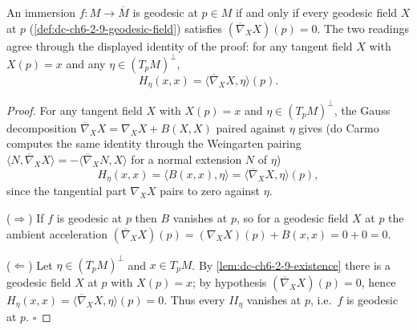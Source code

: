 \begin{lemma}
  \label{lem:dc-ch6-2-9-field}


  An immersion $f:M\to\overline{M}$ is geodesic at $p\in M$ if and only if every
  geodesic field $X$ at $p$
  (\cref{def:dc-ch6-2-9-geodesic-field}) satisfies
  $(\overline{\nabla}_X X)(p)=0$. The two readings agree through the displayed
  identity of the proof: for any tangent field $X$ with $X(p)=x$ and any
  $\eta\in(T_pM)^\perp$,
  $$
  H_\eta(x,x)=\langle\overline{\nabla}_X X,\eta\rangle(p).
  $$
\end{lemma}
\begin{proof}

  For any tangent field $X$ with $X(p)=x$ and $\eta\in(T_pM)^\perp$, the Gauss
  decomposition $\overline{\nabla}_X X=\nabla_X X+B(X,X)$ paired against $\eta$
  gives (do Carmo computes the same identity through the Weingarten pairing
  $\langle N,\overline{\nabla}_X X\rangle=-\langle\overline{\nabla}_X N,X\rangle$
  for a normal extension $N$ of $\eta$)
  $$
  H_\eta(x,x)=\langle B(x,x),\eta\rangle=\langle\overline{\nabla}_X X,\eta\rangle(p),
  $$
  since the tangential part $\nabla_X X$ pairs to zero against $\eta$.

  ($\Rightarrow$) If $f$ is geodesic at $p$ then $B$ vanishes at $p$, so for a
  geodesic field $X$ at $p$ the ambient acceleration
  $(\overline{\nabla}_X X)(p)=(\nabla_X X)(p)+B(x,x)=0+0=0$.

  ($\Leftarrow$) Let $\eta\in(T_pM)^\perp$ and $x\in T_pM$. By
  \cref{lem:dc-ch6-2-9-existence} there is a geodesic field $X$ at $p$ with
  $X(p)=x$; by hypothesis $(\overline{\nabla}_X X)(p)=0$, hence
  $H_\eta(x,x)=\langle\overline{\nabla}_X X,\eta\rangle(p)=0$. Thus every
  $\mathit{II}_\eta$ vanishes at $p$, i.e.\ $f$ is geodesic at $p$. $\square$
\end{proof}

